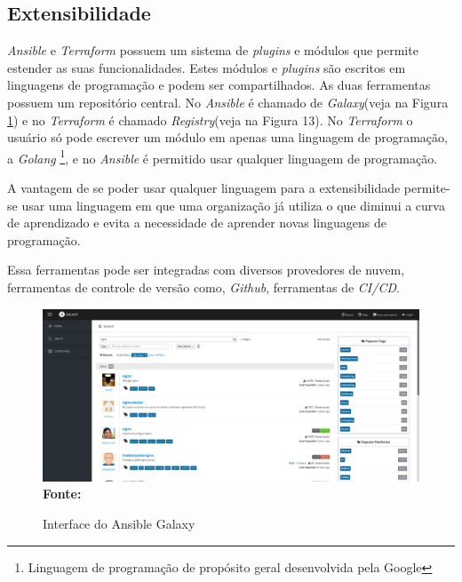 \subsection{Extensibilidade}

\textit{Ansible} e \textit{Terraform} possuem um sistema de \textit{plugins} e módulos que permite estender as suas funcionalidades. Estes módulos e \textit{plugins} são escritos em linguagens de programação e podem ser compartilhados. As duas ferramentas possuem um repositório central. No \textit{Ansible} é chamado de \textit{Galaxy}(veja na Figura \ref{fig:figura12}) e no \textit{Terraform} é chamado \textit{Registry}(veja na Figura 13). No \textit{Terraform} o usuário só pode escrever um módulo em apenas uma linguagem de programação, a \textit{Golang}  \footnote{Linguagem de programação de propósito geral desenvolvida pela Google}, e no \textit{Ansible} é permitido usar qualquer linguagem de programação.  

A vantagem de se poder usar qualquer linguagem para a extensibilidade permite-se usar uma linguagem em que uma organização já utiliza o que diminui a curva de aprendizado e evita a necessidade de aprender novas linguagens de programação.

Essa ferramentas pode ser integradas com diversos provedores de nuvem, ferramentas de controle de versão como, \textit{Github}, ferramentas de \textit{CI/CD}. 

\begin{figure}[H]
	\centering	
	\caption[\hspace{0.1cm} Interface do Ansible Galaxy]{Interface do Ansible Galaxy}
	\vspace{-0.4cm}
	\includegraphics[width=1.0\textwidth]{artigo/figuras/galaxy_2.png}
	 \vspace{-0.2cm}
	\\\textbf{\footnotesize Fonte: \cite{ansible_galaxy}}
	\label{fig:figura12}
\end{figure}
\vspace{-0.5cm}

